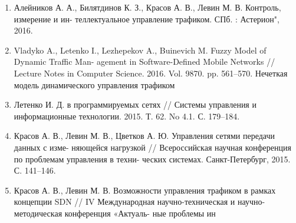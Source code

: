
\begin{enumerate}[{label=\arabic{*}}]
    \item Алейников А. А., Билятдинов К. З., Красов А. В., Левин М. В. Контроль, измерение и ин-
теллектуальное управление трафиком. СПб. : Астерион", 2016.
    \item Vladyko A., Letenko I., Lezhepekov A., Buinevich M. Fuzzy Model of Dynamic Traffic Man-
agement in Software-Defined Mobile Networks // Lecture Notes in Computer Science. 2016. Vol. 9870.
pp. 561–570.
Нечеткая
модель
динамического
управления
трафиком
    \item Летенко И. Д.
в программируемых сетях // Системы управления и информационные технологии. 2015.
Т. 62. No 4.1. С. 179–184.
    \item Красов А. В., Левин М. В., Цветков А. Ю. Управления сетями передачи данных с изме-
няющейся нагрузкой // Всероссийская научная конференция по проблемам управления в техни-
ческих системах. Санкт-Петербург, 2015. С. 141–146.
    \item Красов А. В., Левин М. В. Возможности управления трафиком в рамках концепции
SDN // IV Международная научно-техническая и научно-методическая конференция «Актуаль-
ные проблемы ин
\end{enumerate}
